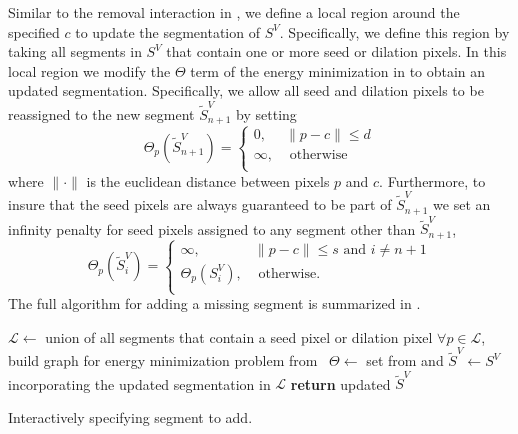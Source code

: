\documentclass[]{spie}  %
\begin{document}
Similar to the removal interaction in , we define a local
region around the specified $c$ to update the segmentation of $S^V$.
Specifically, we define this region by taking all segments in $S^V$
that contain one or more seed or dilation pixels.  In this local
region we modify the $\Theta$ term of the energy minimization in
 to obtain an updated segmentation.  Specifically, we
allow all seed and dilation pixels to be reassigned to the new segment
$\tilde{S}^V_{n+1}$ by setting
\begin{equation}
  \label{eq:d}
  \Theta_p(\tilde{S}^V_{n+1}) = \left\{
    \begin{array}{lcr}
      0, & \| p - c \| \leq d  \\
      \infty, & \textrm{ otherwise} \\
    \end{array}
  \right.
\end{equation}
where $\| \cdot \|$ is the euclidean distance between pixels $p$ and
$c$.  %
Furthermore, to insure that the seed pixels are always guaranteed to
be part of $\tilde{S}^V_{n+1}$ we set an infinity penalty for seed
pixels assigned to any segment other than $\tilde{S}^V_{n+1}$, 
\begin{equation}
  \label{eq:s}
  \Theta_p(\tilde{S}^V_i) = \left\{
    \begin{array}{lcr}
      \infty, & \| p - c \| \leq s \textrm{ and } i \neq n+1  \\
      \Theta_p(S^{V}_i), & \textrm{ otherwise.} \\
    \end{array}
  \right.
\end{equation}
The full algorithm for adding a missing segment is summarized in
.
\begin{algorithm}[!t]
  \centering
  \algrenewcommand{}
  \begin{algorithmic}[1]
    \State $\mathcal{L} \gets$ union of all segments that contain a seed pixel or dilation pixel
    \State $\forall p \in \mathcal{L}$, build graph for energy minimization problem from~\cite{waggoner:11}
    \State $\Theta \gets $ set from  and 
    \State $\tilde{S}^V \gets S^V$ incorporating the updated segmentation in $\mathcal{L}$
    \State \textbf{return} updated $\tilde{S}^V$
    \EndFunction
  \end{algorithmic}
  \caption{Interactively specifying segment to add.}
  \label{alg:addition}
\end{algorithm}
\end{document}
